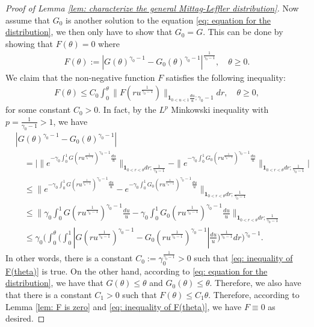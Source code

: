 \begin{proof}[Proof of Lemma \ref{lem: characterize the general Mittag-Leffler distribution}]
	Now assume that $G_0$ is another solution to the equation \eqref{eq: equation for the distribution}, we then only have to show that $G_0 = G$.
	This can be done by showing that $F(\theta) = 0$ where
\begin{align}
	F(\theta)
	:= |G(\theta)^{\gamma_0 - 1} - G_0(\theta)^{\gamma_0 - 1}|^{\frac{1}{\gamma_0 - 1}},
	\quad \theta \geq 0.
\end{align}
	We claim that the non-negative function $F$ satisfies
	the following inequality:
\begin{align}\label{eq: inequality of F(theta)}
	F(\theta)
	\leq C_0 \int_0^\theta \|  F(ru^{\frac{1}{\gamma_0 - 1}})\|_{\mathbf 1_{0<u<1}\frac{du}{u}; \gamma_0 - 1} dr, \quad \theta \geq 0,
\end{align}
	for some constant $C_0 > 0$.
	In fact, by the $L^p$ Minkowski inequality with $p = \frac{1}{\gamma_0 - 1} > 1$, we have
\begin{align}
	&|G(\theta)^{\gamma_0 - 1} - G_0(\theta)^{\gamma_0 - 1}|
	\\&\quad = \Big| \|e^{-\gamma_0\int_0^1 G(ru^{\frac{1}{\gamma_0 - 1}})^{\gamma_0 - 1} \frac{du}{u}} \|_{\mathbf 1_{0<r<\theta}dr;\frac{1}{\gamma_0 - 1}} - \|e^{-\gamma_0\int_0^1 G_0(ru^{\frac{1}{\gamma_0 - 1}})^{\gamma_0 - 1} \frac{du}{u}} \|_{\mathbf 1_{0<r<\theta}dr;\frac{1}{\gamma_0 - 1}} \Big|
	\\ & \quad \leq \| e^{-\gamma_0\int_0^1 G(ru^{\frac{1}{\gamma_0 - 1}})^{\gamma_0 - 1} \frac{du}{u}} - e^{-\gamma_0\int_0^1 G_0(ru^{\frac{1}{\gamma_0 - 1}})^{\gamma_0 - 1} \frac{du}{u}} \|_{\mathbf 1_{0<r<\theta}dr;\frac{1}{\gamma_0 - 1}}
	\\ & \quad \leq \Big\| \gamma_0\int_0^1 G(ru^{\frac{1}{\gamma_0 - 1}})^{\gamma_0 - 1} \frac{du}{u} - \gamma_0\int_0^1 G_0(ru^{\frac{1}{\gamma_0 - 1}})^{\gamma_0 - 1} \frac{du}{u} \Big\|_{\mathbf 1_{0<r<\theta}dr;\frac{1}{\gamma_0 - 1}}
	\\ & \quad \leq \gamma_0 \Bigg( \int_0^\theta \Big( \int_0^1 |G(ru^{\frac{1}{\gamma_0 - 1}})^{\gamma_0 - 1} - G_0(ru^{\frac{1}{\gamma_0 - 1}})^{\gamma_0 - 1}| \frac{du}{u} \Big)^{\frac{1}{\gamma_0 - 1}} dr \Bigg)^{\gamma_0 - 1}.
\end{align}
	In other words, there is a constant $C_0:= \gamma_0^{\frac{1}{\gamma_0 - 1}}>0$ such that \eqref{eq: inequality of F(theta)} is true.
	On the other hand, according to \eqref{eq: equation for the distribution}, we have that $G(\theta) \leq \theta$ and $G_0(\theta) \leq \theta$.
	Therefore, we also have that there is a constant $C_1 > 0$ such that $F(\theta) \leq C_1 \theta$.
	Therefore, according to Lemma \ref{lem: F is zero} and \eqref{eq: inequality of F(theta)}, we have $F \equiv 0$ as desired.
\end{proof}

